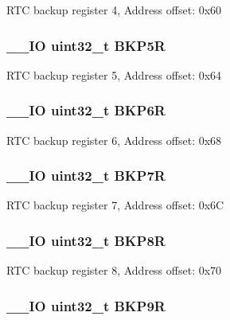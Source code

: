 R\-T\-C backup register 4, Address offset\-: 0x60 \hypertarget{struct_r_t_c___type_def_ab6bed862c0d0476ff4f89f7b9bf3e130}{
\subsubsection[{B\-K\-P5\-R}]{\setlength{\rightskip}{0pt plus 5cm}\-\_\-\-\_\-\-I\-O uint32\-\_\-t B\-K\-P5\-R}}\label{struct_r_t_c___type_def_ab6bed862c0d0476ff4f89f7b9bf3e130}
R\-T\-C backup register 5, Address offset\-: 0x64 \hypertarget{struct_r_t_c___type_def_a1d854d2d7f0452f4c90035952b92d2ba}{
\subsubsection[{B\-K\-P6\-R}]{\setlength{\rightskip}{0pt plus 5cm}\-\_\-\-\_\-\-I\-O uint32\-\_\-t B\-K\-P6\-R}}\label{struct_r_t_c___type_def_a1d854d2d7f0452f4c90035952b92d2ba}
R\-T\-C backup register 6, Address offset\-: 0x68 \hypertarget{struct_r_t_c___type_def_a2ca54ce1a8d2fa9d1ba6d5987ed5e2cf}{
\subsubsection[{B\-K\-P7\-R}]{\setlength{\rightskip}{0pt plus 5cm}\-\_\-\-\_\-\-I\-O uint32\-\_\-t B\-K\-P7\-R}}\label{struct_r_t_c___type_def_a2ca54ce1a8d2fa9d1ba6d5987ed5e2cf}
R\-T\-C backup register 7, Address offset\-: 0x6\-C \hypertarget{struct_r_t_c___type_def_ac1085f6aae54b353c30871fe90c59851}{
\subsubsection[{B\-K\-P8\-R}]{\setlength{\rightskip}{0pt plus 5cm}\-\_\-\-\_\-\-I\-O uint32\-\_\-t B\-K\-P8\-R}}\label{struct_r_t_c___type_def_ac1085f6aae54b353c30871fe90c59851}
R\-T\-C backup register 8, Address offset\-: 0x70 \hypertarget{struct_r_t_c___type_def_a6c33564df6eaf97400e0457dde9b14ef}{
\subsubsection[{B\-K\-P9\-R}]{\setlength{\rightskip}{0pt plus 5cm}\-\_\-\-\_\-\-I\-O uint32\-\_\-t B\-K\-P9\-R}}\label{struct_r_t_c___type_def_a6c33564df6eaf97400e0457dde9b14ef}
